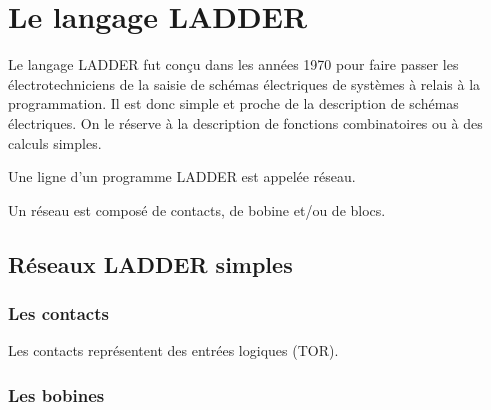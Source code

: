 
\section{Le langage LADDER}
Le langage LADDER fut conçu dans les années 1970 pour faire passer les électrotechniciens de la saisie de schémas électriques de systèmes à relais  à la programmation.
Il est donc simple et proche de la description de schémas électriques.
On le réserve à la description de fonctions combinatoires ou à des calculs simples.

Une ligne d'un programme LADDER est appelée réseau.

Un réseau est composé de contacts, de bobine et/ou de blocs.

\subsection{Réseaux LADDER simples}

\subsubsection{Les contacts}

Les contacts représentent des entrées logiques (TOR).


\subsubsection{Les bobines}

